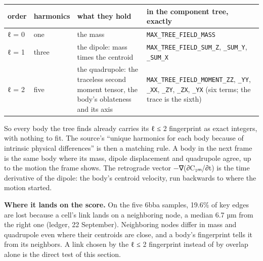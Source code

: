 {\footnotesize
\setlength{\tabcolsep}{6pt}
\begin{longtable}{>{\RaggedRight\arraybackslash}p{}>{\RaggedRight\arraybackslash}p{}>{\RaggedRight\arraybackslash}p{}>{\RaggedRight\arraybackslash}p{}}
\toprule
order & harmonics & what they hold & in the component tree, exactly \\
\midrule
\endhead
ℓ = 0 & one & the mass & \texttt{MAX\_\allowbreak{}TREE\_\allowbreak{}FIELD\_\allowbreak{}MASS} \\
ℓ = 1 & three & the dipole: mass times the centroid & \texttt{MAX\_\allowbreak{}TREE\_\allowbreak{}FIELD\_\allowbreak{}SUM\_\allowbreak{}Z}, \texttt{\_\allowbreak{}SUM\_\allowbreak{}Y}, \texttt{\_\allowbreak{}SUM\_\allowbreak{}X} \\
ℓ = 2 & five & the quadrupole: the traceless second moment tensor, the body's oblateness and its axis & \texttt{MAX\_\allowbreak{}TREE\_\allowbreak{}FIELD\_\allowbreak{}MOMENT\_\allowbreak{}ZZ}, \texttt{\_\allowbreak{}YY}, \texttt{\_\allowbreak{}XX}, \texttt{\_\allowbreak{}ZY}, \texttt{\_\allowbreak{}ZX}, \texttt{\_\allowbreak{}YX} (six terms; the trace is the sixth) \\
\bottomrule
\end{longtable}
}

So every body the tree finds already carries its ℓ ≤ 2 fingerprint as exact integers, with nothing to fit. The source's “unique harmonics for each body because of intrinsic physical differences” is then a matching rule. A body in the next frame is the same body where its mass, dipole displacement and quadrupole agree, up to the motion the frame shows. The retrograde vector −∇(∂C₁ₘ/∂t) is the time derivative of the dipole: the body's centroid velocity, run backwards to where the motion started.

\textbf{Where it lands on the score.} On the five 6bba samples, 19.6\% of key edges are lost because a cell's link lands on a neighboring node, a median 6.7 µm from the right one (ledger, 22 September). Neighboring nodes differ in mass and quadrupole even where their centroids are close, and a body's fingerprint tells it from its neighbors. A link chosen by the ℓ ≤ 2 fingerprint instead of by overlap alone is the direct test of this section.

